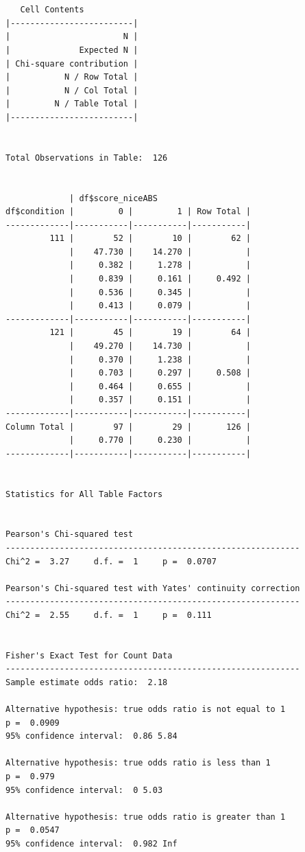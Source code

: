 \documentclass[
  letterpaper,
  DIV=11,
  numbers=noendperiod]{scrreprt}
\begin{document}
\begin{verbatim}

 
   Cell Contents
|-------------------------|
|                       N |
|              Expected N |
| Chi-square contribution |
|           N / Row Total |
|           N / Col Total |
|         N / Table Total |
|-------------------------|

 
Total Observations in Table:  126 

 
             | df$score_niceABS 
df$condition |         0 |         1 | Row Total | 
-------------|-----------|-----------|-----------|
         111 |        52 |        10 |        62 | 
             |    47.730 |    14.270 |           | 
             |     0.382 |     1.278 |           | 
             |     0.839 |     0.161 |     0.492 | 
             |     0.536 |     0.345 |           | 
             |     0.413 |     0.079 |           | 
-------------|-----------|-----------|-----------|
         121 |        45 |        19 |        64 | 
             |    49.270 |    14.730 |           | 
             |     0.370 |     1.238 |           | 
             |     0.703 |     0.297 |     0.508 | 
             |     0.464 |     0.655 |           | 
             |     0.357 |     0.151 |           | 
-------------|-----------|-----------|-----------|
Column Total |        97 |        29 |       126 | 
             |     0.770 |     0.230 |           | 
-------------|-----------|-----------|-----------|

 
Statistics for All Table Factors


Pearson's Chi-squared test 
------------------------------------------------------------
Chi^2 =  3.27     d.f. =  1     p =  0.0707 

Pearson's Chi-squared test with Yates' continuity correction 
------------------------------------------------------------
Chi^2 =  2.55     d.f. =  1     p =  0.111 

 
Fisher's Exact Test for Count Data
------------------------------------------------------------
Sample estimate odds ratio:  2.18 

Alternative hypothesis: true odds ratio is not equal to 1
p =  0.0909 
95% confidence interval:  0.86 5.84 

Alternative hypothesis: true odds ratio is less than 1
p =  0.979 
95% confidence interval:  0 5.03 

Alternative hypothesis: true odds ratio is greater than 1
p =  0.0547 
95% confidence interval:  0.982 Inf 


 
\end{verbatim}
\end{document}
